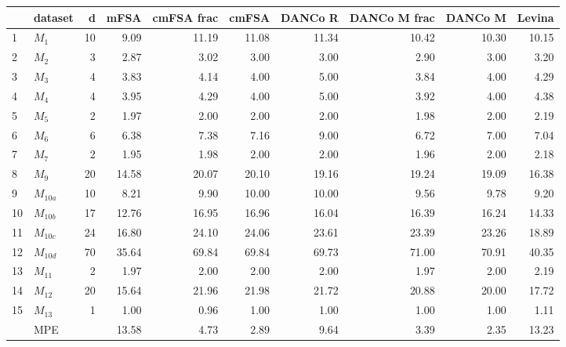 \begin{tabular}{llrrrrrrrr}
\toprule
{} &    dataset &   d &   mFSA &  cmFSA frac &  cmFSA &  DANCo R &  DANCo M frac &  DANCo M &  Levina \\
\midrule
1  &      $M_1$ &  10 &   9.09 &       11.19 &  11.08 &    11.34 &         10.42 &    10.30 &   10.15 \\
2  &      $M_2$ &   3 &   2.87 &        3.02 &   3.00 &     3.00 &          2.90 &     3.00 &    3.20 \\
3  &      $M_3$ &   4 &   3.83 &        4.14 &   4.00 &     5.00 &          3.84 &     4.00 &    4.29 \\
4  &      $M_4$ &   4 &   3.95 &        4.29 &   4.00 &     5.00 &          3.92 &     4.00 &    4.38 \\
5  &      $M_5$ &   2 &   1.97 &        2.00 &   2.00 &     2.00 &          1.98 &     2.00 &    2.19 \\
6  &      $M_6$ &   6 &   6.38 &        7.38 &   7.16 &     9.00 &          6.72 &     7.00 &    7.04 \\
7  &      $M_7$ &   2 &   1.95 &        1.98 &   2.00 &     2.00 &          1.96 &     2.00 &    2.18 \\
8  &      $M_9$ &  20 &  14.58 &       20.07 &  20.10 &    19.16 &         19.24 &    19.09 &   16.38 \\
9  &  $M_{10a}$ &  10 &   8.21 &        9.90 &  10.00 &    10.00 &          9.56 &     9.78 &    9.20 \\
10 &  $M_{10b}$ &  17 &  12.76 &       16.95 &  16.96 &    16.04 &         16.39 &    16.24 &   14.33 \\
11 &  $M_{10c}$ &  24 &  16.80 &       24.10 &  24.06 &    23.61 &         23.39 &    23.26 &   18.89 \\
12 &  $M_{10d}$ &  70 &  35.64 &       69.84 &  69.84 &    69.73 &         71.00 &    70.91 &   40.35 \\
13 &   $M_{11}$ &   2 &   1.97 &        2.00 &   2.00 &     2.00 &          1.97 &     2.00 &    2.19 \\
14 &   $M_{12}$ &  20 &  15.64 &       21.96 &  21.98 &    21.72 &         20.88 &    20.00 &   17.72 \\
15 &   $M_{13}$ &   1 &   1.00 &        0.96 &   1.00 &     1.00 &          1.00 &     1.00 &    1.11 \\
\bottomrule
&MPE& & 13.58 & 4.73& 2.89& 9.64&3.39&2.35&13.23
\end{tabular}
